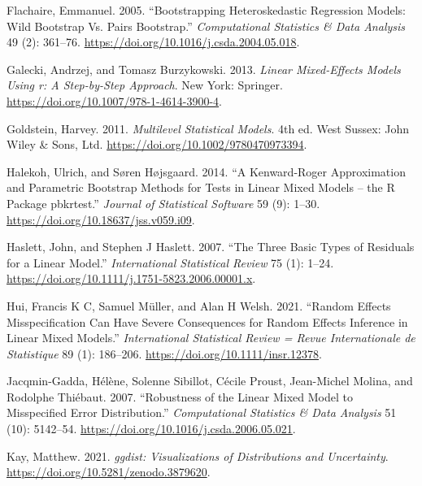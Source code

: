 \begin{CSLReferences}{1}{0}
\leavevmode{}%
Flachaire, Emmanuel. 2005. {``Bootstrapping Heteroskedastic Regression Models: Wild Bootstrap Vs. Pairs Bootstrap.''} \emph{Computational Statistics \& Data Analysis} 49 (2): 361--76. \url{https://doi.org/10.1016/j.csda.2004.05.018}.

\leavevmode{}%
Galecki, Andrzej, and Tomasz Burzykowski. 2013. \emph{Linear Mixed-Effects Models Using r: A Step-by-Step Approach}. New York: Springer. \url{https://doi.org/10.1007/978-1-4614-3900-4}.

\leavevmode{}%
Goldstein, Harvey. 2011. \emph{Multilevel Statistical Models}. 4th ed. West Sussex: John Wiley \& Sons, Ltd. \url{https://doi.org/10.1002/9780470973394}.

\leavevmode{}%
Halekoh, Ulrich, and Søren Højsgaard. 2014. {``A Kenward-Roger Approximation and Parametric Bootstrap Methods for Tests in Linear Mixed Models -- the {R} Package {pbkrtest}.''} \emph{Journal of Statistical Software} 59 (9): 1--30. \url{https://doi.org/10.18637/jss.v059.i09}.

\leavevmode{}%
Haslett, John, and Stephen J Haslett. 2007. {``The Three Basic Types of Residuals for a Linear Model.''} \emph{International Statistical Review} 75 (1): 1--24. \url{https://doi.org/10.1111/j.1751-5823.2006.00001.x}.

\leavevmode{}%
Hui, Francis K C, Samuel Müller, and Alan H Welsh. 2021. {``Random Effects Misspecification Can Have Severe Consequences for Random Effects Inference in Linear Mixed Models.''} \emph{International Statistical Review = Revue Internationale de Statistique} 89 (1): 186--206. \url{https://doi.org/10.1111/insr.12378}.

\leavevmode{}%
Jacqmin-Gadda, Hélène, Solenne Sibillot, Cécile Proust, Jean-Michel Molina, and Rodolphe Thiébaut. 2007. {``Robustness of the Linear Mixed Model to Misspecified Error Distribution.''} \emph{Computational Statistics \& Data Analysis} 51 (10): 5142--54. \url{https://doi.org/10.1016/j.csda.2006.05.021}.

\leavevmode{}%
Kay, Matthew. 2021. \emph{{ggdist}: Visualizations of Distributions and Uncertainty}. \url{https://doi.org/10.5281/zenodo.3879620}.


\end{CSLReferences}

